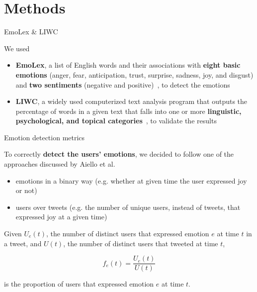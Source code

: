\documentclass[8pt]{beamer}  %
\begin{document}
\section{Methods}

\begin{frame}{EmoLex \& LIWC}

    We used
    
    \begin{itemize}
        \item \textbf{EmoLex}, a list of English words and their associations with \textbf{eight basic emotions} (anger, fear, anticipation, trust, surprise, sadness, joy, and disgust) and \textbf{two sentiments} (negative and positive)~\autocite{ncrwebsite}, to detect the emotions
        \item \textbf{LIWC}, a widely used computerized text analysis program that outputs the percentage of words in a given text that falls into one or more \textbf{linguistic, psychological, and topical categories}~\autocite{enwiki:1023542720}, to validate the results
    \end{itemize}

\end{frame}

\begin{frame}{Emotion detection metrics}

    To correctly \textbf{detect the users' emotions}, we decided to follow one of the approaches discussed by Aiello et al.~\autocite{aiello2020epidemic}
	
	\begin{itemize}
    	\item emotions in a binary way (e.g. whether at given time the user expressed joy or not)
    	\item users over tweets (e.g. the number of unique users, instead of tweets, that expressed joy at a given time)
    \end{itemize}
	
    \begin{definition}
    \label{def:user-emotions}
    	Given \(U_e(t)\), the number of distinct users that expressed emotion \(e\) at time \(t\) in a tweet, and \(U(t)\), the number of distinct users that tweeted at time \(t\),
    	
    	\[f_e(t) = \frac{U_e(t)}{U(t)}\]
    	
    	is the proportion of users that expressed emotion \(e\) at time \(t\).	
    \end{definition}

\end{frame}
\end{document}
